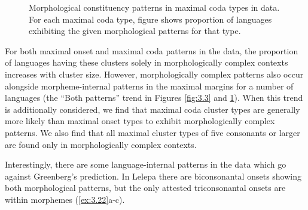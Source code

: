 \begin{figure}
\caption{\label{fig:3.4}Morphological constituency patterns in maximal coda types in data. For each maximal coda type, figure shows proportion of languages exhibiting the given morphological patterns for that type.}
\end{figure}

  For both maximal onset and maximal coda patterns in the data, the proportion of languages having these clusters solely in morphologically complex contexts increases with cluster size. However, morphologically complex patterns also occur alongside morpheme-internal patterns in the maximal margins for a number of languages (the “Both patterns” trend in Figures \ref{fig:3.3} and \ref{fig:3.4}). When this trend is additionally considered, we find that maximal coda cluster types are generally more likely than maximal onset types to exhibit morphologically complex patterns. We also find that all maximal cluster types of five consonants or larger are found only in morphologically complex contexts.

  Interestingly, there are some language-internal patterns in the data which go against Greenberg’s prediction. In Lelepa there are biconsonantal onsets showing both morphological patterns, but the only attested triconsonantal onsets are within morphemes (\ref{ex:3.22}a-c).

\ea\label{ex:3.22}

